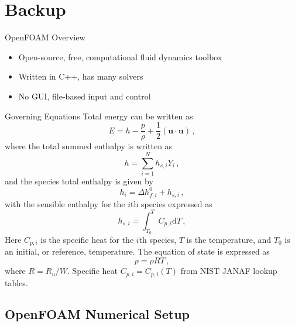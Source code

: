 \section{Backup}

\begin{frame}{OpenFOAM Overview}
\begin{itemize}
\item Open-source, free, computational fluid dynamics toolbox 
\item Written in C++, has many solvers 
\item No GUI, file-based input and control
\end{itemize}
\end{frame}

\begin{frame}[allowframebreaks]{Governing Equations}
Total energy \cite{kuo} can be written as 
\begin{equation}
E = h - \frac{p}{\rho} +\frac{1}{2} \left(\bm{u}\cdot\bm{u}\right)\,,
\end{equation}
where the total summed enthalpy is written \cite{kuo} as 
\begin{equation}
h = \sum_{i = 1}^Nh_{s,i}Y_i\,,
\end{equation}
and the species total enthalpy \cite{kuo} is given by 
\begin{equation}
h_{i} = \Delta h_{f,i}^0 + h_{s,i}\,,
\end{equation}
with the sensible enthalpy for the $i$th species expressed as
\begin{equation}
h_{s,i} = \int_{T_0}^T C_{p,i}\mathrm{d}T\,,
\end{equation}
Here $C_{p,i}$ is the specific heat for the $i$th species, $T$ is the temperature, and $T_0$ is an initial, or reference, temperature. The equation of state is expressed as 
\begin{equation}
p = \rho R T\,,
\end{equation}
where $R=R_u/W$. Specific heat $C_{p,i}=C_{p,i}(T)$ from NIST JANAF \cite{janaf} lookup tables.  
\end{frame}


\subsection{OpenFOAM Numerical Setup}


